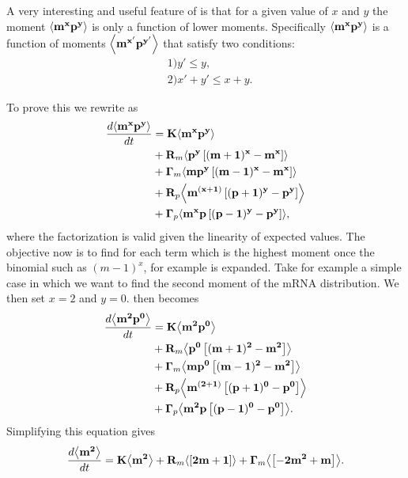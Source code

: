 A very interesting and useful feature of  is that for a given
value of $x$ and $y$ the moment $\mathbf{\left\langle m^x p^y \right\rangle}$ is only a function of lower
moments. Specifically $\mathbf{\left\langle m^x p^y \right\rangle}$ is a function of moments
$\mathbf{\left\langle m^{x'} p^{y'} \right\rangle}$ that satisfy two conditions:
\begin{equation}
  \begin{aligned}
    &1) y' \leq y,\\
  &2) x' + y' \leq x + y.
  \end{aligned}
  \label{seq_mom_conditions}
\end{equation}

To prove this we rewrite  as
\begin{equation}
  \begin{aligned}
    {d{\mathbf{\left\langle m^x p^y \right\rangle}} \over dt} &=
    \mathbf{K} \mathbf{\left\langle m^x p^y \right\rangle}\\
    &+ \mathbf{R}_m \mathbf{\left\langle p^y \left[ (m + 1)^x -m^x \right] \right\rangle}\\
    &+ \mathbf{\Gamma}_m \mathbf{\left\langle m p^y \left[ (m - 1)^x - m^x \right] \right\rangle}\\
    &+ \mathbf{R}_p \mathbf{\left\langle m^{(x + 1)} \left[ (p + 1)^y - p^y \right] \right\rangle}\\
    &+ \mathbf{\Gamma}_p \mathbf{\left\langle m^x p \left[ (p - 1)^y - p^y \right] \right\rangle},
    \label{seq_mom_ode_factorized}
  \end{aligned}
\end{equation}
where the factorization is valid given the linearity of expected values. The
objective now is to find for each term which is the highest moment once the
binomial such as $(m - 1)^x$, for example is expanded. Take for example a simple
case in which we want to find the second moment of the mRNA distribution. We
then set $x = 2$ and $y = 0$.  then becomes
\begin{equation}
  \begin{aligned}
    {d{\mathbf{\left\langle m^2 p^0 \right\rangle}} \over dt} &=
    \mathbf{K} \mathbf{\left\langle m^2 p^0 \right\rangle}\\
    &+ \mathbf{R}_m \mathbf{\left\langle p^0 \left[ (m + 1)^2 - m^2 \right] \right\rangle}\\
    &+ \mathbf{\Gamma}_m \mathbf{\left\langle m p^0 \left[ (m - 1)^2 - m^2 \right] \right\rangle}\\
    &+ \mathbf{R}_p \mathbf{\left\langle m^{(2 + 1)} \left[ (p + 1)^0 - p^0 \right] \right\rangle}\\
    &+ \mathbf{\Gamma}_p \mathbf{\left\langle m^2 p \left[ (p - 1)^0 - p^0 \right] \right\rangle}.
  \end{aligned}
\end{equation}
Simplifying this equation gives
\begin{equation}
    {d{\mathbf{\left\langle m^2 \right\rangle}} \over dt} =
    \mathbf{K} \mathbf{\left\langle m^2 \right\rangle}
    + \mathbf{R}_m \mathbf{\left\langle \left[ 2m + 1 \right] \right\rangle}
    + \mathbf{\Gamma}_m \mathbf{\left\langle \left[- 2m^2 + m \right] \right\rangle}.
    \label{seq_second_mom_mRNA}
\end{equation}

